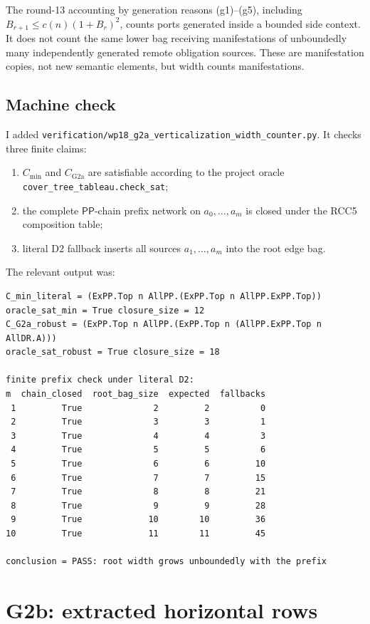 \documentclass[11pt]{article}
\newcommand{\PP}{\mathsf{PP}}
\newcommand{\code}[1]{\texttt{#1}}
\begin{document}
The round-13 accounting by generation reasons (g1)--(g5), including
$B_{r+1}\le c(n)(1+B_r)^2$, counts ports generated inside a bounded side
context.  It does not count the same lower bag receiving manifestations of
unboundedly many independently generated remote obligation sources.  These are
manifestation copies, not new semantic elements, but width counts
manifestations.

\subsection{Machine check}

I added \code{verification/wp18\_g2a\_verticalization\_width\_counter.py}.
It checks three finite claims:
\begin{enumerate}[leftmargin=2em]
\item $C_{\min}$ and $C_{\mathrm{G2a}}$ are satisfiable according to the
project oracle \code{cover\_tree\_tableau.check\_sat};
\item the complete $\PP$-chain prefix network on $a_0,\ldots,a_m$ is closed
under the RCC5 composition table;
\item literal D2 fallback inserts all sources $a_1,\ldots,a_m$ into the root
edge bag.
\end{enumerate}
The relevant output was:
\begin{verbatim}
C_min_literal = (ExPP.Top n AllPP.(ExPP.Top n AllPP.ExPP.Top))
oracle_sat_min = True closure_size = 12
C_G2a_robust = (ExPP.Top n AllPP.(ExPP.Top n (AllPP.ExPP.Top n AllDR.A)))
oracle_sat_robust = True closure_size = 18

finite prefix check under literal D2:
m  chain_closed  root_bag_size  expected  fallbacks
 1         True              2         2          0
 2         True              3         3          1
 3         True              4         4          3
 4         True              5         5          6
 5         True              6         6         10
 6         True              7         7         15
 7         True              8         8         21
 8         True              9         9         28
 9         True             10        10         36
10         True             11        11         45

conclusion = PASS: root width grows unboundedly with the prefix
\end{verbatim}

\section{G2b: extracted horizontal rows}
\end{document}
